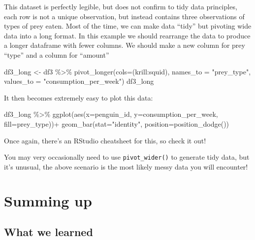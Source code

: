 \documentclass[
]{book}
\newenvironment{Shaded}{\begin{snugshade}}{\end{snugshade}}
\newcommand{\AttributeTok}[1]{\textcolor[rgb]{0.77,0.63,0.00}{#1}}
\newcommand{\FunctionTok}[1]{\textcolor[rgb]{0.00,0.00,0.00}{#1}}
\newcommand{\NormalTok}[1]{#1}
\newcommand{\OtherTok}[1]{\textcolor[rgb]{0.56,0.35,0.01}{#1}}
\newcommand{\SpecialCharTok}[1]{\textcolor[rgb]{0.00,0.00,0.00}{#1}}
\newcommand{\StringTok}[1]{\textcolor[rgb]{0.31,0.60,0.02}{#1}}
\begin{document}
This dataset is perfectly legible, but does not confirm to tidy data principles, each row is not a unique observation, but instead contains three observations of types of prey eaten.
Most of the time, we can make data ``tidy'' but pivoting wide data into a long format. In this example we should rearrange the data to produce a longer dataframe with fewer columns. We should make a new column for prey ``type'' and a column for ``amount''

\begin{Shaded}
\begin{Highlighting}[]
\NormalTok{df3\_long }\OtherTok{\textless{}{-}}\NormalTok{ df3 }\SpecialCharTok{\%\textgreater{}\%} 
  \FunctionTok{pivot\_longer}\NormalTok{(}\AttributeTok{cols=}\NormalTok{(krill}\SpecialCharTok{:}\NormalTok{squid), }\AttributeTok{names\_to =} \StringTok{"prey\_type"}\NormalTok{, }\AttributeTok{values\_to =} \StringTok{"consumption\_per\_week"}\NormalTok{)}
\NormalTok{df3\_long}
\end{Highlighting}
\end{Shaded}

It then becomes extremely easy to plot this data:

\begin{Shaded}
\begin{Highlighting}[]
\NormalTok{df3\_long }\SpecialCharTok{\%\textgreater{}\%} 
  \FunctionTok{ggplot}\NormalTok{(}\FunctionTok{aes}\NormalTok{(}\AttributeTok{x=}\NormalTok{penguin\_id, }\AttributeTok{y=}\NormalTok{consumption\_per\_week, }\AttributeTok{fill=}\NormalTok{prey\_type))}\SpecialCharTok{+}
  \FunctionTok{geom\_bar}\NormalTok{(}\AttributeTok{stat=}\StringTok{"identity"}\NormalTok{, }\AttributeTok{position=}\FunctionTok{position\_dodge}\NormalTok{())}
\end{Highlighting}
\end{Shaded}

Once again, there's an RStudio cheatsheet for this, so check it out!

You may very occasionally need to use \texttt{pivot\_wider()} to generate tidy data, but it's unusual, the above scenario is the most likely messy data you will encounter!

\hypertarget{summing-up-1}{%
\section{Summing up}\label{summing-up-1}}

\hypertarget{what-we-learned-4}{%
\subsection{What we learned}\label{what-we-learned-4}}
\end{document}
